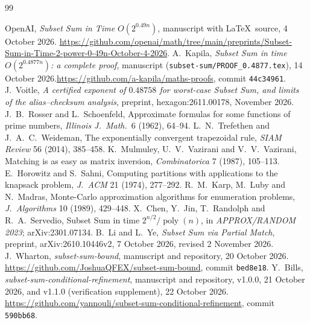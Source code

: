 \documentclass[11pt]{article}
\theoremstyle{definition}
\newcommand{\poly}{\operatorname{poly}}
\begin{document}
\begin{thebibliography}{99}
\raggedright
\makeatletter\g@addto@macro\UrlBreaks{\do\-}\makeatother
{} OpenAI, \emph{Subset Sum in Time $O(2^{0.49n})$}, manuscript with \LaTeX\ source, 4 October 2026.\newline
\url{https://github.com/openai/math/tree/main/preprints/Subset-Sum-in-Time-2-power-0-49n-October-4-2026}.
 A.~Kapila, \emph{Subset Sum in time $O(2^{0.4877n})$: a complete proof}, manuscript
(\texttt{subset-sum/PROOF\_0.4877.tex}), 14 October 2026.\newline \url{https://github.com/a-kapila/maths-proofs}, commit
\texttt{44c34961}.
 J.~Voitle, \emph{A certified exponent of $0.48758$ for worst-case Subset Sum, and limits of the
alias--checksum analysis}, preprint, hexagon:2611.00178, November 2026.
 J.~B.~Rosser and L.~Schoenfeld, Approximate formulas for some functions of prime numbers,
\emph{Illinois J.\ Math.}\ 6 (1962), 64--94.
 L.~N.~Trefethen and J.~A.~C.~Weideman, The exponentially convergent trapezoidal rule,
\emph{SIAM Review} 56 (2014), 385--458.
 K.~Mulmuley, U.~V.~Vazirani and V.~V.~Vazirani, Matching is as easy as matrix inversion,
\emph{Combinatorica} 7 (1987), 105--113.
 E.~Horowitz and S.~Sahni, Computing partitions with applications to the knapsack problem,
\emph{J.\ ACM} 21 (1974), 277--292.
 R.~M.~Karp, M.~Luby and N.~Madras, Monte-Carlo approximation algorithms for enumeration problems,
\emph{J.\ Algorithms} 10 (1989), 429--448.
 X.~Chen, Y.~Jin, T.~Randolph and R.~A.~Servedio, Subset Sum in time $2^{n/2}/\poly(n)$, in
\emph{APPROX/RANDOM 2023}; arXiv:2301.07134.
 B.~Li and L.~Ye, \emph{Subset Sum via Partial Match}, preprint, arXiv:2610.10446v2, 7 October 2026,
revised 2 November 2026.
 J.~Wharton, \emph{subset-sum-bound}, manuscript and repository, 20 October 2026.\newline
\url{https://github.com/JoshuaQFEX/subset-sum-bound}, commit \texttt{bed8e18}.
 Y.~Bills, \emph{subset-sum-conditional-refinement}, manuscript and repository, v1.0.0, 21 October 2026,
and v1.1.0 (verification supplement), 22 October 2026.\newline
\url{https://github.com/yannouli/subset-sum-conditional-refinement}, commit \texttt{590bb68}.
\end{thebibliography}
\end{document}
